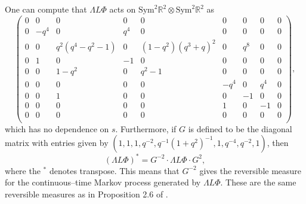 \documentclass[12pt]{ximera}
\begin{document}
One can compute that $\Lambda L \Phi$ acts on $\mathrm{Sym}^2 \mathbb{R}^2 \otimes \mathrm{Sym}^2 \mathbb{R}^2$ as 
$$
\left(
\begin{array}{ccccccccc}
 0 & 0 & 0 & 0 & 0 & 0 & 0 & 0 & 0 \\
 0 & -q^4 & 0 & q^4 & 0 & 0 & 0 & 0 & 0 \\
 0 & 0 & q^2 \left(q^4-q^2-1\right) & 0 & \left(1-q^2\right) \left(q^3+q\right)^2 &
   0 & q^8 & 0 & 0 \\
 0 & 1 & 0 & -1 & 0 & 0 & 0 & 0 & 0 \\
 0 & 0 & 1-q^2 & 0 & q^2-1 & 0 & 0 & 0 & 0 \\
 0 & 0 & 0 & 0 & 0 & -q^4 & 0 & q^4 & 0 \\
 0 & 0 & 1 & 0 & 0 & 0 & -1 & 0 & 0 \\
 0 & 0 & 0 & 0 & 0 & 1 & 0 & -1 & 0 \\
 0 & 0 & 0 & 0 & 0 & 0 & 0 & 0 & 0 \\
\end{array}
\right),
$$
which has no dependence on $s$. Furthermore, if $G$ is defined to be the diagonal matrix with entries given by $(1,1,1,q^{-2},q^{-1}(1+q^2)^{-1},1,q^{-4},q^{-2},1)$, then 
$$
(\Lambda L \Phi)^* = G^{-2} \cdot \Lambda L \Phi \cdot G^2,
$$
where the $ ^*$ denotes transpose. This means that $G^{-2}$ gives the reversible measure for the continuous--time Markov process generated by $\Lambda L \Phi$. These are the same reversible measures as in Proposition 2.6 of \cite{KIMRN}.



\end{document}
